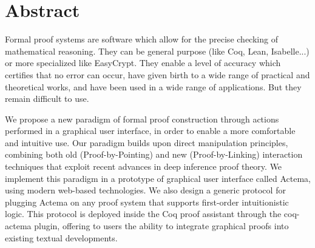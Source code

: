 \dedication{
	The ultimate meaning of logic is this ability to manipulate.
	\flushright -- Jean-Yves Girard.
}


\maketitle


\chapter*{Abstract}

Formal proof systems are software which allow for the precise checking of
mathematical reasoning. They can be general purpose (like Coq, Lean, Isabelle...)
or more specialized like EasyCrypt. They enable a level of accuracy which
certifies that no error can occur, have given birth to a wide range of practical
and theoretical works, and have been used in a wide range of applications. But
they remain difficult to use.

We propose a new paradigm of formal proof construction through actions performed
in a graphical user interface, in order to enable a more comfortable and
intuitive use. Our paradigm builds upon direct manipulation principles,
combining both old (Proof-by-Pointing) and new (Proof-by-Linking) interaction
techniques that exploit recent advances in deep inference proof theory. We
implement this paradigm in a prototype of graphical user interface called
Actema, using modern web-based technologies. We also design a generic protocol
for plugging Actema on any proof system that supports first-order intuitionistic
logic. This protocol is deployed inside the Coq proof assistant through the
coq-actema plugin, offering to users the ability to integrate graphical proofs
into existing textual developments.


